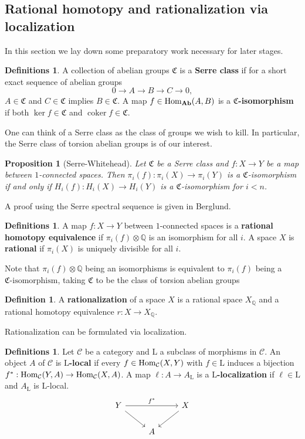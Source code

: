 \documentclass[psamsfonts]{amsart}
\newtheorem{prop}[thm]{Proposition}
\theoremstyle{definition}
\newtheorem{defn}[thm]{Definition}
\newtheorem{defns}[thm]{Definitions}
\theoremstyle{remark}
\newcommand{\Q}{\mathbb{Q}}
\newcommand{\Ab}{\mathbf{Ab}}
\newcommand{\Hom}{\textup{Hom}}
\DeclareMathOperator{\coker}{coker}
\numberwithin{equation}{section}
\begin{document}
\subsection{Rational homotopy and rationalization via localization}

In this section we lay down some preparatory work necessary for later stages.

\begin{defns}
A collection of abelian groups $\mathfrak{C}$ is a \textbf{Serre class} if for a short exact sequence of abelian groups
\[0\to A\to B\to C\to0,\] $A\in\mathfrak{C}$ and $C\in\mathfrak{C}$ implies $B\in\mathfrak{C}$. A map $f\in\Hom_{\Ab}(A,B)$ is a \textbf{$\mathfrak{C}$-isomorphism} if both $\ker f\in\mathfrak{C}$ and $\coker f\in\mathfrak{C}$.
\end{defns}

One can think of a Serre class as the class of groups we wish to kill. In particular, the Serre class of torsion abelian groups is of our interest.

\begin{prop}[Serre-Whitehead]
Let $\mathfrak{C}$ be a Serre class and $f:X\to Y$ be a map between $1$-connected spaces. Then $\pi_i(f):\pi_i(X)\to\pi_i(Y)$ is a $\mathfrak{C}$-isomorphism if and only if $H_i(f):H_i(X)\to H_i(Y)$ is a $\mathfrak{C}$-isomorphism for $i<n$.
\end{prop}

A proof using the Serre spectral sequence is given in Berglund\cite{Berglund}.

\begin{defns}
A map $f:X\to Y$ between $1$-connected spaces is a \textbf{rational homotopy equivalence} if $\pi_i(f)\otimes\Q$ is an isomorphism for all $i$. A space $X$ is \textbf{rational} if $\pi_i(X)$ is uniquely divisible for all $i$.
\end{defns}

Note that $\pi_i(f)\otimes\Q$ being an isomorphisms is equivalent to $\pi_i(f)$ being a ${\mathfrak{C}\textrm{-isomorphism}}$, taking $\mathfrak{C}$ to be the class of torsion abelian groups

\begin{defn}
A \textbf{rationalization} of a space $X$ is a rational space $X_\Q$ and a rational homotopy equivalence $r:X\to X_\Q$.
\end{defn}

Rationalization can be formulated via localization.

\begin{defns}
Let $\mathcal{C}$ be a category and $\mathrm{L}$ a subclass of morphisms in $\mathcal{C}$. An object $A$ of $\mathcal{C}$ is \textbf{$\mathrm{L}$-local} if every $f\in\Hom_\mathcal{C}(X,Y)$ with $f\in\mathrm{L}$ induces a bijection $f^\ast:\Hom_\mathcal{C}(Y,A)\to\Hom_\mathcal{C}(X,A)$. A map $\ell:A\to A_\mathrm{L}$ is a \textbf{$\mathrm{L}$-localization} if $\ell\in\mathrm{L}$ and $A_\mathrm{L}$ is $\mathrm{L}$-local.
\[\begin{tikzcd}
Y\arrow[dr]\arrow[rr,"f^\ast"]&&X\arrow[dl]\\
&A
\end{tikzcd}\]
\end{defns}
\end{document}
